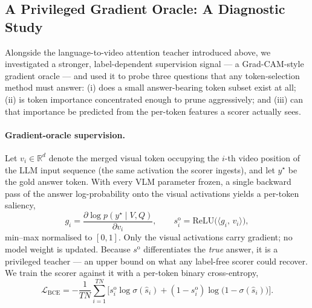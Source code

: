 \documentclass[12pt]{article}
\begin{document}
\subsection{A Privileged Gradient Oracle: A Diagnostic Study}

Alongside the language-to-video attention teacher introduced above, we
investigated a stronger, label-dependent supervision signal --- a
Grad-CAM-style gradient oracle --- and used it to probe three questions
that any token-selection method must answer: (i) does a small
answer-bearing token subset exist at all; (ii) is token importance
concentrated enough to prune aggressively; and (iii) can that importance
be predicted from the per-token features a scorer actually sees.

\paragraph{Gradient-oracle supervision.}
Let $v_i \in \mathbb{R}^{d}$ denote the merged visual token occupying the
$i$-th video position of the LLM input sequence (the same activation the
scorer ingests), and let $y^\star$ be the gold answer token. With every
VLM parameter frozen, a single backward pass of the answer
log-probability onto the visual activations yields a per-token saliency,
%
\begin{equation}
    g_i = \frac{\partial \log p(y^\star \mid V, Q)}{\partial v_i},
    \qquad
    s^{\text{o}}_i = \mathrm{ReLU}\!\big(\langle g_i,\, v_i \rangle\big),
\end{equation}
%
min--max normalised to $[0, 1]$. Only the visual activations carry
gradient; no model weight is updated. Because $s^{\text{o}}$
differentiates the \emph{true} answer, it is a privileged teacher --- an
upper bound on what any label-free scorer could recover. We train the
scorer against it with a per-token binary cross-entropy,
%
\begin{equation}
    \mathcal{L}_{\text{BCE}} = -\frac{1}{T N}\sum_{i=1}^{T N}
    \Big[ s^{\text{o}}_i \log \sigma(\hat{s}_i)
    + (1 - s^{\text{o}}_i)\log\big(1 - \sigma(\hat{s}_i)\big) \Big].
\end{equation}
\end{document}

